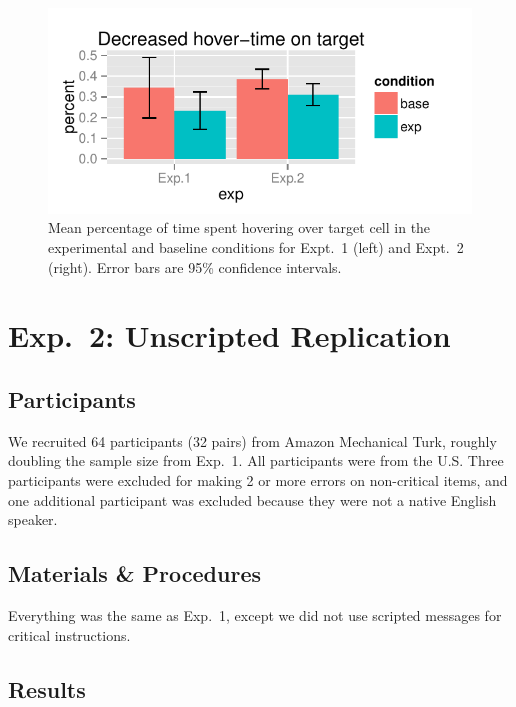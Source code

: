 \documentclass[10pt,letterpaper]{article}
\begin{document}
 \begin{figure}[b!]
\begin{center}
\includegraphics[scale=.5]{images/mousetracking.pdf}
\caption{Mean percentage of time spent hovering over target cell in the experimental and baseline conditions for Expt.~1 (left) and Expt.~2 (right). Error bars are 95\% confidence intervals.}
\label{fig:hover}
\end{center}
\end{figure}


\section{Exp.~2: Unscripted Replication}
\label{sec:Exp2}

\subsection{Participants}

We recruited 64 participants (32 pairs) from Amazon Mechanical Turk, roughly doubling the sample size from Exp.~1. All participants were from the U.S. Three participants were excluded for making 2 or more errors on non-critical items, and one additional participant was excluded because they were not a native English speaker.

\subsection{Materials \& Procedures}

Everything was the same as Exp.~1, except we did not use scripted messages for critical instructions. 

\subsection{Results}
\end{document}
